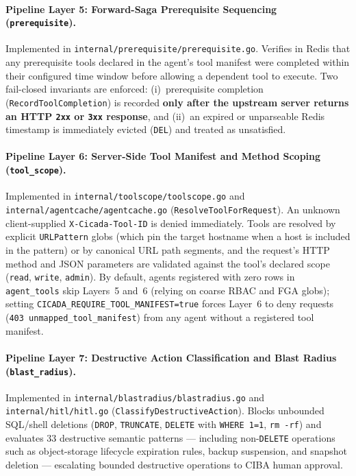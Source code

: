 \documentclass[11pt, a4paper]{article}
\begin{document}
\paragraph{Pipeline Layer 5: Forward-Saga Prerequisite Sequencing (\texttt{prerequisite}).}
Implemented in \texttt{internal/prerequisite/prerequisite.go}. Verifies in Redis that any prerequisite tools declared in the agent's tool manifest were completed within their configured time window before allowing a dependent tool to execute. Two fail-closed invariants are enforced: (i)~prerequisite completion (\texttt{RecordToolCompletion}) is recorded \textbf{only after the upstream server returns an HTTP \texttt{2xx} or \texttt{3xx} response}, and (ii)~an expired or unparseable Redis timestamp is immediately evicted (\texttt{DEL}) and treated as unsatisfied.

\paragraph{Pipeline Layer 6: Server-Side Tool Manifest and Method Scoping (\texttt{tool\_scope}).}
Implemented in \texttt{internal/toolscope/toolscope.go} and \texttt{internal/agentcache/agentcache.go} (\texttt{ResolveToolForRequest}). An unknown client-supplied \texttt{X-Cicada-Tool-ID} is denied immediately. Tools are resolved by explicit \texttt{URLPattern} globs (which pin the target hostname when a host is included in the pattern) or by canonical URL path segments, and the request's HTTP method and JSON parameters are validated against the tool's declared scope (\texttt{read}, \texttt{write}, \texttt{admin}). By default, agents registered with zero rows in \texttt{agent\_tools} skip Layers~5 and~6 (relying on coarse RBAC and FGA globs); setting \texttt{CICADA\_REQUIRE\_TOOL\_MANIFEST=true} forces Layer~6 to deny requests (\texttt{403 unmapped\_tool\_manifest}) from any agent without a registered tool manifest.

\paragraph{Pipeline Layer 7: Destructive Action Classification and Blast Radius (\texttt{blast\_radius}).}
Implemented in \texttt{internal/blastradius/blastradius.go} and \texttt{internal/hitl/hitl.go} (\texttt{ClassifyDestructiveAction}). Blocks unbounded SQL/shell deletions (\texttt{DROP}, \texttt{TRUNCATE}, \texttt{DELETE} with \texttt{WHERE 1=1}, \texttt{rm -rf}) and evaluates 33 destructive semantic patterns --- including non-\texttt{DELETE} operations such as object-storage lifecycle expiration rules, backup suspension, and snapshot deletion --- escalating bounded destructive operations to CIBA human approval.
\end{document}
